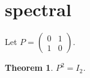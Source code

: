 \documentclass{article}
\newtheorem{theorem}{Theorem}
\begin{document}
\section{spectral}
Let $P=\begin{pmatrix}0&1\\1&0\end{pmatrix}$.
\begin{theorem}\label{thm:RS01}
$P^2=I_2$.
\end{theorem}
\end{document}
